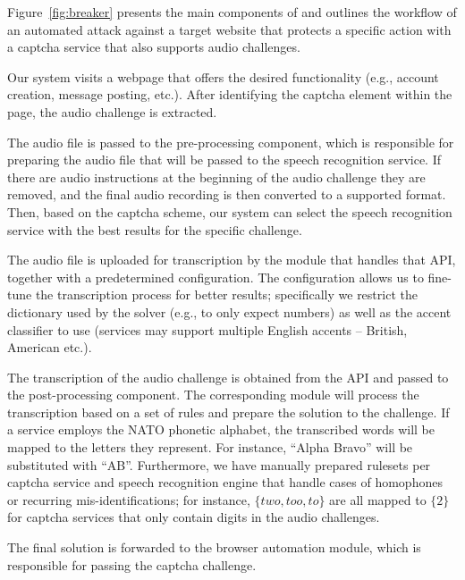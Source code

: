 Figure~\ref{fig:breaker} presents the main components of \system and outlines the workflow of
an automated attack against a target website that protects a specific action with a captcha 
service that also supports audio challenges.

\protect{} Our system visits a webpage that offers the desired functionality 
(e.g., account creation, message posting, etc.). After identifying the captcha element within 
the page, the audio challenge is extracted.

\protect{} The audio file is passed to the pre-processing component, which is responsible 
for preparing the audio file that will be passed to the speech recognition service. If there are audio 
instructions at the beginning of the audio challenge they are removed, and the final audio
recording is then converted to a supported format. Then, based on the captcha scheme, our system
can select the speech recognition service with the best results for the specific challenge.

\protect{} The audio file is uploaded for transcription by the module that handles that API, 
together with a predetermined configuration. The configuration allows us to fine-tune the transcription process
for better results; specifically we restrict the dictionary used by the solver (e.g., to only expect  
numbers) as well as the accent classifier to use (services may support multiple English accents 
-- British, American etc.).

\protect{} The transcription of the audio challenge is obtained from the API
and passed to the post-processing component. The corresponding module will process the transcription 
based on a set of rules %
and prepare the solution to the challenge. If a service employs the 
NATO phonetic alphabet, the transcribed words will be mapped to the letters they represent. For instance, 
``Alpha Bravo'' will be substituted with ``AB''. Furthermore, we have manually prepared rulesets
per captcha service and speech recognition engine %
that handle cases of homophones or recurring mis-identifications; for instance, $\{two,too,to\}$ are all
mapped to $\{2\}$ for captcha services that only contain digits in the audio challenges.

\protect{} The final solution is forwarded to the browser automation module,
which is responsible for passing the captcha challenge.

